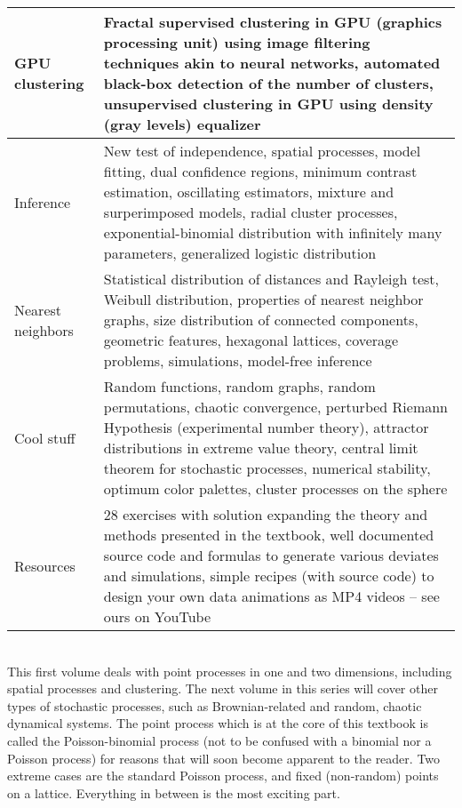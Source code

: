 \documentclass[10pt]{article}
\begin{document}
\begin{center}
\begin{tabular}{p{}p{}}
\hline
GPU clustering & Fractal supervised clustering in GPU (graphics processing unit) using image filtering techniques akin to neural networks, automated black-box detection of the number of clusters, unsupervised clustering in GPU using density (gray levels) equalizer \\
\hline
Inference &  New test of independence,  spatial processes, model fitting, dual confidence regions, minimum contrast estimation, oscillating estimators, mixture and surperimposed models, radial cluster processes, 
exponential-binomial distribution with infinitely many parameters, generalized logistic distribution\\
\hline
Nearest neighbors & Statistical distribution of distances and Rayleigh test, Weibull distribution, properties of nearest neighbor graphs, size distribution of connected components, geometric features, hexagonal lattices, coverage problems, simulations, model-free inference \\
\hline
Cool stuff & Random functions, random graphs, random permutations, chaotic convergence, perturbed Riemann Hypothesis (experimental number theory), attractor distributions in extreme value theory,
central limit theorem for stochastic processes, numerical stability, optimum color palettes, cluster processes on the sphere\\
\hline
Resources & 28 exercises with solution expanding the theory and methods presented in the textbook, well documented source code and formulas to generate various deviates and simulations, simple recipes (with source code) to design your own data animations as MP4 videos -- see ours on YouTube\\
\hline
\end{tabular}
\end{center}


\quad \\

This first volume deals with point processes in one and two dimensions, including spatial processes and clustering. The next volume in this series will cover other types of stochastic processes, such as Brownian-related and random, chaotic dynamical systems. The point process which is at the core of this textbook is called the Poisson-binomial process (not to be confused with a binomial nor a Poisson process) for reasons that will soon become apparent to the reader. Two extreme cases are the standard Poisson process, and fixed (non-random) points on a lattice. Everything in between is the most exciting part. 
\end{document}
